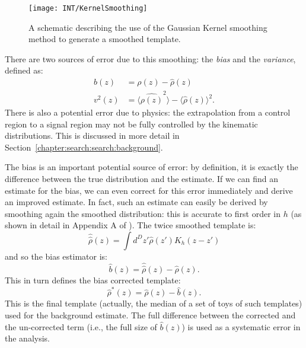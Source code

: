 \begin{figure}
\centering
\texttt{[image: INT/KernelSmoothing]}
\label{fig:search:substructure:smoothing}
\caption{A schematic describing the use of the Gaussian Kernel smoothing method to generate a smoothed template.}
\end{figure}


There are two sources of error due to this smoothing: the \textit{bias} and the \textit{variance}, defined as:
%
\begin{align}
b(z) &= \rho(z) - \hat{\rho}(z)\nonumber\\
v^2(z) &= \langle \hat{\rho(z)}^2 \rangle  - \langle \hat{\rho}(z) \rangle^2.
\end{align}
%
There is also a potential error due to  physics: the extrapolation from a control region to a signal region may not be fully controlled by the kinematic distributions. This is discussed in more detail in Section~\ref{chapter:search:search:background}. 

The bias is an important potential source of error: by definition, it is exactly the difference between the true distribution and the estimate. If we can find an estimate for the bias, we can even correct for this error immediately and derive an improved estimate. In fact, such an estimate can easily be derived by smoothing again the smoothed distribution: this is accurate to first order in $h$ (as shown in detail in Appendix A of \cite{MassTemplates}). The twice smoothed template is:
%
\begin{equation}
\hat{\hat{\rho}}(z) = \int d^D z' \hat{\rho}(z') K_h (z-z')
\end{equation}
% 
and so the bias estimator is:
%
\begin{equation}
\hat{b}(z) = \hat{\hat{\rho}}(z) - \hat{\rho}(z).
\end{equation}
%
This in turn defines the bias corrected template:
%
\begin{equation}
\hat{\rho}^*(z) = \hat{\rho}(z) - \hat{b}(z).
\end{equation}
%
This is the final template (actually, the median of a set of toys of such templates) used for the background estimate. The full difference between the corrected and the un-corrected term (i.e., the full size of $\hat{b}(z)$) is used as a systematic error in the analysis.

